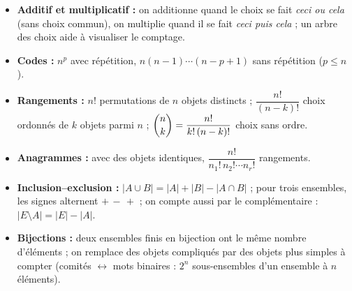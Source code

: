 \documentclass[11pt]{article}
\begin{document}
\begin{retenir}
\begin{itemize}
    \item \textbf{Additif et multiplicatif :} on additionne quand le choix se fait \emph{ceci ou cela}
    (sans choix commun), on multiplie quand il se fait \emph{ceci puis cela} ; un arbre des choix
    aide à visualiser le comptage.
    \item \textbf{Codes :} \(n^p\) avec répétition, \(n(n-1)\cdots(n-p+1)\) sans répétition (\(p\le n\)).
    \item \textbf{Rangements :} \(n!\) permutations de \(n\) objets distincts ;
    \(\dfrac{n!}{(n-k)!}\) choix ordonnés de \(k\) objets parmi \(n\) ;
    \(\dbinom{n}{k}=\dfrac{n!}{k!\,(n-k)!}\) choix sans ordre.
    \item \textbf{Anagrammes :} avec des objets identiques, \(\dfrac{n!}{n_1!\,n_2!\cdots n_r!}\) rangements.
    \item \textbf{Inclusion--exclusion :}
    \(|A\cup B|=|A|+|B|-|A\cap B|\) ; pour trois ensembles, les signes alternent
    \(+\,-\,+\) ; on compte aussi par le complémentaire : \(|E\setminus A|=|E|-|A|\).
    \item \textbf{Bijections :} deux ensembles finis en bijection ont le même nombre d'éléments ;
    on remplace des objets compliqués par des objets plus simples à compter
    (comités \(\leftrightarrow\) mots binaires : \(2^n\) sous-ensembles d'un ensemble à \(n\) éléments).
\end{itemize}
\end{retenir}

\end{document}

